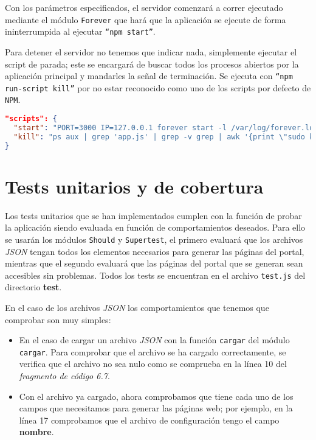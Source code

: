Con los parámetros especificados, el servidor comenzará a correr ejecutado mediante el módulo {\tt Forever} que hará que la aplicación se ejecute de forma ininterrumpida al ejecutar {\tt ``npm start''}.

\bigskip
Para detener el servidor no tenemos que indicar nada, simplemente ejecutar el script de parada; este se encargará de buscar todos los procesos abiertos por la aplicación principal y mandarles la señal de terminación. Se ejecuta con {\tt ``npm run-script kill''} por no estar reconocido como uno de los scripts por defecto de {\tt NPM}.

\begin{lstlisting}[language=json,caption={Scripts de inicio y detención},label={lst:ini_para}]
"scripts": {
  "start": "PORT=3000 IP=127.0.0.1 forever start -l /var/log/forever.log -a -o /var/log/out.log -e /var/log/err.log ./app.js",
  "kill": "ps aux | grep 'app.js' | grep -v grep | awk '{print \"sudo kill -9 \" $2}' | sh"
}
\end{lstlisting}

\section{Tests unitarios y de cobertura}

Los tests unitarios que se han implementados cumplen con la función de probar la aplicación siendo evaluada en función de comportamientos deseados. Para ello se usarán los módulos {\tt Should} y {\tt Supertest}, el primero evaluará que los archivos \textit{JSON} tengan todos los elementos necesarios para generar las páginas del portal, mientras que el segundo evaluará que las páginas del portal que se generan sean accesibles sin problemas. Todos los tests se encuentran en el archivo {\tt test.js} del directorio \textbf{test}.

\bigskip
En el caso de los archivos \textit{JSON} los comportamientos que tenemos que comprobar son muy simples:

\begin{itemize}
	\item En el caso de cargar un archivo \textit{JSON} con la función {\tt cargar} del módulo {\tt cargar}. Para comprobar que el archivo se ha cargado correctamente, se verifica que el archivo no sea nulo como se comprueba en la línea 10 del \textit{fragmento de código 6.7}.
	\item Con el archivo ya cargado, ahora comprobamos que tiene cada uno de los campos que necesitamos para generar las páginas web; por ejemplo, en la línea 17 comprobamos que el archivo de configuración tengo el campo \textbf{nombre}.
\end{itemize}

